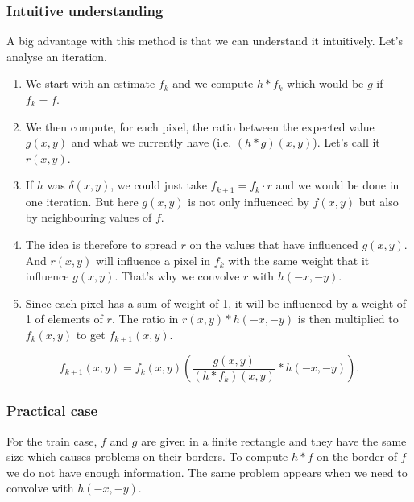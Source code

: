 \subsubsection{Intuitive understanding}
\label{sec:lucy-intuitive}
A big advantage with this method is that we can understand
it intuitively.
Let's analyse an iteration.
\begin{enumerate}
  \item We start with an estimate $f_k$ and we compute
    $h * f_k$ which would be $g$ if $f_k = f$.
  \item We then compute, for each pixel, the ratio between
    the expected value $g(x,y)$ and what we currently have
    (i.e.  $(h * g)(x,y)$).
    Let's call it $r(x,y)$.
  \item If $h$ was $\delta(x,y)$, we could just take
    $f_{k+1} = f_k \cdot r$ and we would be done in one
    iteration.
    But here $g(x,y)$ is not only influenced by
    $f(x,y)$ but also by neighbouring values of $f$.
  \item The idea is therefore to spread $r$ on the values
    that have influenced $g(x,y)$.
    And $r(x,y)$ will influence a pixel in $f_k$ with the same
    weight that it influence $g(x,y)$.
    That's why we convolve $r$ with $h(-x,-y)$.
  \item Since each pixel has a sum of weight of 1,
    it will be influenced by a weight of 1 of elements of $r$.
    The ratio in $r(x,y) * h(-x, -y)$ is then multiplied to
    $f_k(x,y)$ to get $f_{k+1}(x,y)$.
\end{enumerate}
\[ f_{k+1}(x,y) = f_k(x,y)\left(\frac{g(x,y)}{(h*f_k)(x,y)} * h(-x,-y)\right). \]

\subsubsection{Practical case}
For the train case, $f$ and $g$ are given in a finite rectangle
and they have the same size which causes problems on their borders.
To compute $h * f$ on the border of $f$ we do not have enough
information. The same problem appears when we need to
convolve with $h(-x,-y)$.

